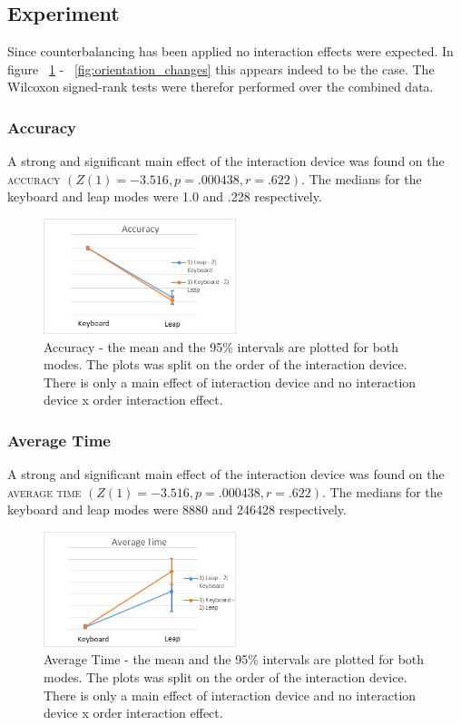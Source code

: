 \subsection{Experiment}
Since counterbalancing has been applied no interaction effects were expected. In figure ~\ref{fig:accuracy} - ~\ref{fig:orientation_changes} this appears indeed to be the case. The Wilcoxon signed-rank tests were therefor performed over the combined data.

\subsubsection{Accuracy}

A strong and significant main effect of the interaction device was found on the \textsc{accuracy} $(Z(1) = -3.516, p = .000438, r = .622)$. The medians for the keyboard and leap modes were 1.0 and .228 respectively.

\begin{figure}[!htbp]
\centering
\includegraphics[width=0.5\textwidth]{imgs/results/accuracy}
\caption{Accuracy - the mean and the 95\% intervals are plotted for both modes. The plots was split on the order of the interaction device. There is only a main effect of interaction device and no interaction device x order interaction effect.}
\label{fig:accuracy}
\end{figure}

\subsubsection{Average Time}

A strong and significant main effect of the interaction device was found on the \textsc{average time} $(Z(1) = -3.516, p = .000438, r = .622)$. The medians for the keyboard and leap modes were 8880 and 246428 respectively.

\begin{figure}[!htbp]
\centering
\includegraphics[width=0.5\textwidth]{imgs/results/average_time}
\caption{Average Time - the mean and the 95\% intervals are plotted for both modes. The plots was split on the order of the interaction device. There is only a main effect of interaction device and no interaction device x order interaction effect.}
\label{fig:average_time}
\end{figure}

